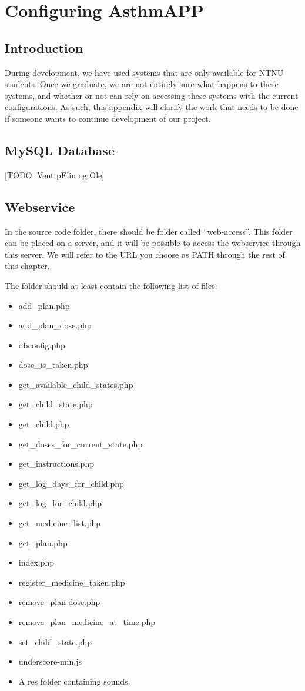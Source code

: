 \chapter{Configuring AsthmAPP}
\label{app:configure-asthmapp}

\section{Introduction}
During development, we have used systems that are only available for NTNU students. Once we graduate, we are not entirely sure what happens to these systems, and whether or not \app{} can rely on accessing these systems with the current configurations. As such, this appendix will clarify the work that needs to be done if someone wants to continue development of our project. 

\section{MySQL Database}

[TODO: Vent p\a Elin og Ole]

\section{Webservice}

In the source code folder, there should be folder called ``web-access''. This folder can be placed on a server, and it will be possible to access the webservice through this server. We will refer to the URL you choose as PATH through the rest of this chapter. 

The folder should at least contain the following list of files:

\begin{itemize}
\itemsep0em
  \item add\_plan.php
  \item add\_plan\_dose.php
  \item dbconfig.php
  \item dose\_is\_taken.php
  \item get\_available\_child\_states.php
  \item get\_child\_state.php
  \item get\_child.php
  \item get\_doses\_for\_current\_state.php
  \item get\_instructions.php
  \item get\_log\_days\_for\_child.php
  \item get\_log\_for\_child.php
  \item get\_medicine\_list.php
  \item get\_plan.php
  \item index.php
  \item register\_medicine\_taken.php
  \item remove\_plan-dose.php
  \item remove\_plan\_medicine\_at\_time.php
  \item set\_child\_state.php
  \item underscore-min.js
  \item A res folder containing sounds. 
\end{itemize}

